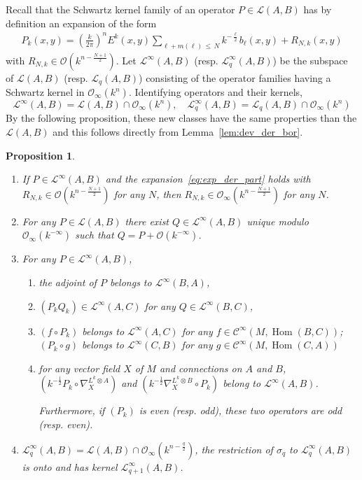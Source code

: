 \documentclass[10pt,a4paper]{article}
\newtheorem{prop}[theo]{Proposition}
\theoremstyle{definition}
\numberwithin{equation}{section}
\newcommand{\si}{{\sigma}}
\newcommand{\op}{\operatorname}
\newcommand{\Ci}{{\mathcal{C}}^{\infty}}
\newcommand{\bigo}{\mathcal{O}}
\newcommand{\biginf}{\mathcal{O}_{\infty}}
\newcommand{\lag}{\mathcal{L}}
\begin{document}
Recall that the Schwartz kernel family of an operator $P \in \lag (A,B)$ has by definition an expansion of the form
\begin{gather}\label{eq:exp_der_part}
P_k (x,y) = \left(\frac{k}{2\pi} \right)^n E^k(x,y) \sum_{ \ell + m (\ell)\,\leqslant\,N} k^{- \frac{\ell}{2}} b_{\ell} (x,y) + R_{N,k} (x,y)
\end{gather}
with $R_{N,k} \in \bigo (k^{n- \frac{N+1}{2}})$.  Let $\lag^{\infty} (A,B)$ (resp. $\lag_q^{\infty} (A,B)$) be the subspace of $\lag (A,B)$ (resp. $\lag_q (A,B)$) consisting of the operator families having a Schwartz kernel in $\biginf (k^n)$.  Identifying operators and their kernels,
\[
\lag^{\infty} (A,B) = \lag (A,B) \cap \biginf (k^n), \quad \lag_q^{\infty} (A,B) = \lag_q (A,B) \cap \biginf (k^n)
\]
By the following proposition, these new classes have the same properties than the $\lag (A,B)$ and this follows directly from Lemma~\ref{lem:dev_der_bor}.

\begin{prop}\label{prop:versionlinfty}\leavevmode
\begin{enumerate}
\item \label{item:1}
If $P \in
\lag^{\infty} (A,B)$ and the expansion~\eqref{eq:exp_der_part} holds with $R_{N,k} \in \bigo (k^{n- \frac{N+1}{2}})$ for any $N$, then $R_{N,k} \in\biginf (k^{n- \frac{N+1}{2}})$ for any $N$.
\item \label{item:2}
For any $P \in \lag (A,B)$ there exist $Q \in
\lag^{\infty} (A,B)$ unique modulo $\biginf (k^{-\infty})$ such that $Q = P +\bigo (k^{-\infty})$.
\item \label{item:3}
 For any $ P \in \lag^{\infty}(A,B)$,
\begin{enumerate}
\item \label{item:a}
the adjoint of $P$ belongs to $\lag^{\infty} (B,A)$,
\item \label{item:b}
$(P_kQ_k) \in \lag ^{\infty} (A,C)$ for any $Q \in \lag ^{\infty} (B,C)$,
\item \label{item:c}
$(f \circ P_k)$ belongs to $\lag^{\infty} (A,C)$ for any $f \in \Ci (M,
\op{Hom} (B,C))$; $(P_k \circ g) $ belongs to $\lag ^{\infty} (C,B)$ for any $g \in \Ci (M, \op{Hom} (C,A))$
\item \label{item:d}
for any vector field $X$ of $M$ and connections on $A$ and $B$, $(k^{-\frac{1}{2}} P_k \circ \nabla^{L^k \otimes A}_X) $ and $(k^{-\frac{1}{2}} \nabla^{L^k \otimes B}_X \circ P_k)$ belong to $\lag^{\infty} (A,B)$.

Furthermore, if $(P_k)$ is even (resp. odd), these two operators are odd (resp. even).
\end{enumerate}

\item \label{item:4}
$\lag_q^{\infty} (A,B) = \lag (A,B) \cap \biginf (k^{n -
\frac{q}{2}})$, the restriction of $\si_q$ to $\lag_q^{\infty} (A,B)$ is onto and has kernel $\lag_{q+1} ^{\infty} (A,B)$.
\end{enumerate}
\end{prop}
\end{document}
